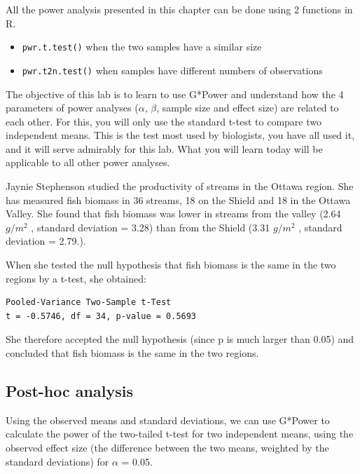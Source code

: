 \documentclass[
  12pt,
]{book}
\makeatletter
\providecommand{\tightlist}{%
  \setlength{\itemsep}{0pt}\setlength{\parskip}{0pt}}
\newenvironment{kframe}{%
\medskip{}
\setlength{\fboxsep}{.8em}
\def\at@end@of@kframe{}%
\ifinner\ifhmode%
 \def\at@end@of@kframe{\end{minipage}}%
 \begin{minipage}{\columnwidth}%
\fi\fi%
\def\FrameCommand##1{\hskip\@totalleftmargin \hskip-\fboxsep
\colorbox{incolor}{##1}\hskip-\fboxsep
    \hskip-\linewidth \hskip-\@totalleftmargin \hskip\columnwidth}%
\MakeFramed {\advance\hsize-\width
  \@totalleftmargin\z@ \linewidth\hsize
  \@setminipage}}%
{\par\unskip\endMakeFramed%
\at@end@of@kframe}
\newenvironment{rmdblock}[1]
 {
 \begin{itemize}
 \renewcommand{\labelitemi}{
   \raisebox{-.7\height}[0pt][0pt]{
     {\setkeys{Gin}{width=3em,keepaspectratio}\texttt{[image: images/\#1]}}
   }
 }
 \begin{kframe}
 \setlength{\fboxsep}{1em}
 \item
 }
 {
 \end{kframe}
 \end{itemize}
 }
\newenvironment{rmdimportant}
  {\begin{rmdblock}{important}}
  {\end{rmdblock}}
\makeatother
\begin{document}
\begin{rmdimportant}
All the power analysis presented in this chapter can be done using 2 functions
in R.

\begin{itemize}
\tightlist
\item
  \texttt{pwr.t.test()} when the two samples have a similar size
\item
  \texttt{pwr.t2n.test()} when samples have different numbers of observations
\end{itemize}
\end{rmdimportant}

The objective of this lab is to learn to use G*Power and understand how the 4 parameters of power analyses (\(\alpha\), \(\beta\), sample size and effect size) are related to each other. For this, you will only use the standard t-test to compare two independent means. This is the test most used by biologists, you have all used it, and it will serve admirably for this lab. What you will learn today will be applicable to all other power analyses.

Jaynie Stephenson studied the productivity of streams in the Ottawa region. She has measured fish biomass in 36 streams, 18 on the Shield and 18 in the Ottawa Valley. She found that fish biomass was lower in streams from the valley (2.64 \(g/m^2\) , standard deviation = 3.28) than from the Shield (3.31 \(g/m^2\) , standard deviation = 2.79.).

When she tested the null hypothesis that fish biomass is the same in the two regions by a t-test, she obtained:

\begin{verbatim}
Pooled-Variance Two-Sample t-Test
t = -0.5746, df = 34, p-value = 0.5693
\end{verbatim}

She therefore accepted the null hypothesis (since p is much larger than 0.05) and concluded that fish biomass is the same in the two regions.

\hypertarget{post-hoc-analysis}{%
\subsection{Post-hoc analysis}\label{post-hoc-analysis}}

Using the observed means and standard deviations, we can use G*Power to calculate the power of the two-tailed t-test for two independent means, using the observed effect size (the difference between the two means, weighted by the standard deviations) for \(\alpha\) = 0.05.
\end{document}
